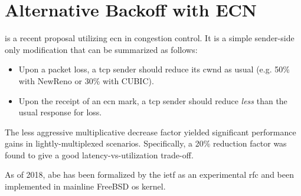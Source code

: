 




\section{Alternative Backoff with ECN}

 \cite{abe} is a recent proposal utilizing \gls{ecn} in congestion control. It is a simple sender-side only modification that can be summarized as follows:

\begin{itemize}
    \item Upon a packet loss, a \gls{tcp} sender should reduce its \gls{cwnd} as usual (e.g. 50\% with NewReno or 30\% with CUBIC).
    \item Upon the receipt of an \gls{ecn} mark, a \gls{tcp} sender should reduce \textit{less} than the usual response for loss.
\end{itemize}

The less aggressive multiplicative decrease factor yielded significant performance gains in lightly-multiplexed scenarios. Specifically, a 20\% reduction factor was found to give a good latency-vs-utilization trade-off.

As of 2018, \gls{abe} has been formalized by the \gls{ietf} as an experimental \gls{rfc} \cite{rfc8511} and been implemented in mainline FreeBSD \gls{os} kernel.

